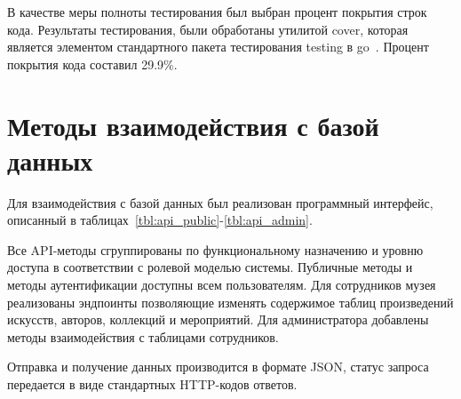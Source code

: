 В качестве меры полноты тестирования был выбран процент покрытия строк кода. Результаты тестирования, были обработаны утилитой cover, которая является элементом стандартного пакета тестирования testing в go~\cite{testing}. Процент покрытия кода составил 29.9\%.

%
%	

\section{Методы взаимодействия с базой данных}

Для взаимодействия с базой данных был реализован программный интерфейс, описанный в таблицах~\ref{tbl:api_public}-\ref{tbl:api_admin}. 

Все API-методы сгруппированы по функциональному назначению и уровню доступа в соответствии с ролевой моделью системы. Публичные методы и методы аутентификации доступны всем пользователям. Для сотрудников музея реализованы эндпоинты позволяющие изменять содержимое таблиц произведений искусств, авторов, коллекций и мероприятий. Для администратора добавлены методы взаимодействия с таблицами сотрудников.

Отправка и получение данных производится в формате JSON, статус запроса передается в виде стандартных HTTP-кодов ответов.


